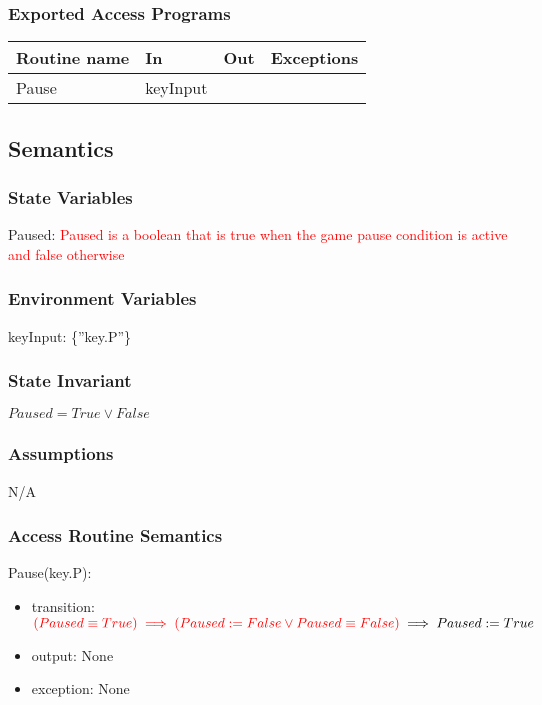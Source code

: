 \documentclass[12pt]{article}
\begin{document}
\subsubsection* {Exported Access Programs}

\begin{tabular}{| l | l | l | l |}
\hline
\textbf{Routine name} & \textbf{In} & \textbf{Out} & \textbf{Exceptions}\\
\hline
Pause & keyInput &  &  \\
\hline
\end{tabular}

\subsection* {Semantics}

\subsubsection* {State Variables}
Paused: \textcolor{red}{Paused is a boolean that is true when the game pause condition is active and false otherwise} 

\subsubsection* {Environment Variables}

keyInput: \{”key.P”\}

\subsubsection* {State Invariant}

$Paused = True \lor False $

\subsubsection* {Assumptions}

N/A

\subsubsection* {Access Routine Semantics}

\noindent Pause(key.P):
\begin{itemize}
\item transition: $\textcolor{red}{(Paused \equiv True) \implies (Paused := False \lor Paused \equiv False)} \implies Paused := True$
\item output: None
\item exception: None
\end{itemize}
\end{document}
